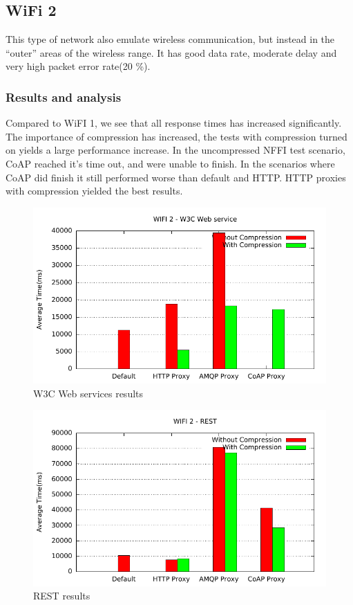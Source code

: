 \subsection{WiFi 2}

This type of network also emulate wireless communication, but instead in the
``outer'' areas of the wireless range. It has good data rate, moderate delay
and very high packet error rate(20 \%).


\subsubsection{Results and analysis}

Compared to WiFI 1, we see that all response times has increased
significantly. The importance of compression has increased, the tests with
compression turned on yields a large performance increase. In the uncompressed
NFFI test scenario, CoAP reached it's time out, and were unable to finish. In
the scenarios where CoAP did finish it still performed worse than default and
HTTP. HTTP proxies with compression yielded the best results.

\begin{figure}[H]
\center
\includegraphics[scale=0.75]{../results/wifi2/nffi/out.pdf}
\caption{W3C Web services results}
\end{figure}

\begin{figure}[H]
\center
\includegraphics[scale=0.75]{../results/wifi2/rest/out.pdf}
\caption{REST results}
\end{figure}


